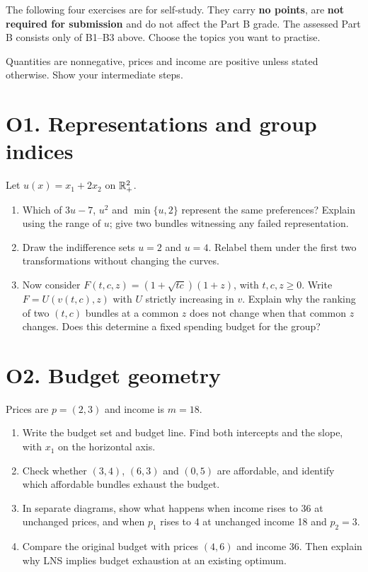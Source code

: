 The following four exercises are for self-study. They carry \textbf{no points}, are \textbf{not required for submission} and do not affect the Part B grade. The assessed Part B consists only of B1--B3 above. Choose the topics you want to practise.

Quantities are nonnegative, prices and income are positive unless stated otherwise. Show your intermediate steps.
\section*{O1. Representations and group indices}
Let $u(x)=x_1+2x_2$ on $\mathbb R_+^2$.
\begin{enumerate}[label=(\alph*)]
\item Which of $3u-7$, $u^2$ and $\min\{u,2\}$ represent the same preferences? Explain using the range of $u$; give two bundles witnessing any failed representation.
\item Draw the indifference sets $u=2$ and $u=4$. Relabel them under the first two transformations without changing the curves.
\item Now consider $F(t,c,z)=(1+\sqrt{tc})(1+z)$, with $t,c,z\ge0$. Write $F=U(v(t,c),z)$ with $U$ strictly increasing in $v$. Explain why the ranking of two $(t,c)$ bundles at a common $z$ does not change when that common $z$ changes. Does this determine a fixed spending budget for the group?
\end{enumerate}
\section*{O2. Budget geometry}
Prices are $p=(2,3)$ and income is $m=18$.
\begin{enumerate}[label=(\alph*)]
\item Write the budget set and budget line. Find both intercepts and the slope, with $x_1$ on the horizontal axis.
\item Check whether $(3,4)$, $(6,3)$ and $(0,5)$ are affordable, and identify which affordable bundles exhaust the budget.
\item In separate diagrams, show what happens when income rises to 36 at unchanged prices, and when $p_1$ rises to 4 at unchanged income 18 and $p_2=3$.
\item Compare the original budget with prices $(4,6)$ and income 36. Then explain why LNS implies budget exhaustion at an existing optimum.
\end{enumerate}


